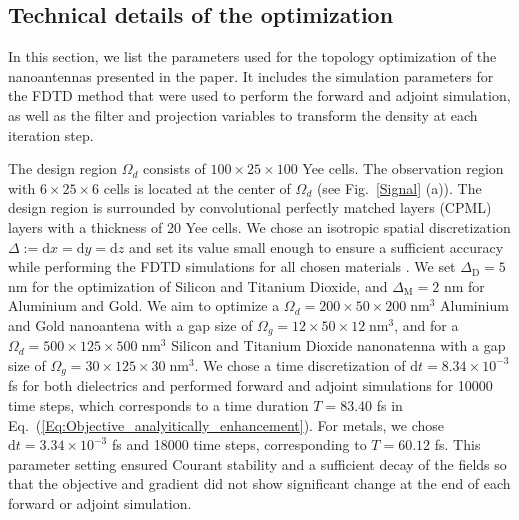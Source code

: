 \documentclass[aps,prl,twocolumn,superscriptaddress,longbibliography]{revtex4-1}
\begin{document}
\subsection{Technical details of the optimization}\label{Sec:TopOptParams}
In this section, we list the parameters used for the topology optimization of the nanoantennas presented in the paper. It includes the simulation parameters for the FDTD method that were used to perform the forward and adjoint simulation, as well as the filter and projection variables to transform the density at each iteration step.\par
The design region $\Omega_{d}$ consists of $100 \times 25 \times 100$ Yee cells. The observation region with $6 \times 25 \times 6$ cells is located at the center of $\Omega_{d}$ (see Fig.~\ref{Signal} (a)). The design region is surrounded by convolutional perfectly matched layers (CPML) layers with a thickness of 20 Yee cells. We chose an isotropic spatial discretization $\Delta:=\mathrm{d}x=\mathrm{d}y=\mathrm{d}z$ and set its value small enough to ensure a sufficient accuracy while performing the FDTD simulations for all chosen materials \cite{convergence}. We set $\Delta_{\mathrm{D}}=5$ nm for the optimization of Silicon and Titanium Dioxide, and $\Delta_{\mathrm{M}}=2$ nm for Aluminium and Gold. 
We aim to optimize a $\Omega_{d}=200\times50\times200\; \mathrm{nm}^3$ Aluminium and Gold nanoantena with a gap size of $\Omega_{g}=12\times50\times12\; \mathrm{nm}^3$, and for a $\Omega_{d}=500 \times125\times500 \; \mathrm{nm}^3$ Silicon and Titanium Dioxide nanonatenna with a gap size of $\Omega_{g}=30\times125\times30\; \mathrm{nm}^3$. 
We chose a time discretization of $\mathrm{d}t=8.34\times10^{-3}$ fs for both dielectrics and performed forward and adjoint simulations for 10000 time steps, which corresponds to a time duration $T=83.40$ fs in Eq.~(\ref{Eq:Objective_analyitically_enhancement}). For metals, we chose $\mathrm{d}t=3.34\times10^{-3}$ fs and 18000 time steps, corresponding to $T=60.12$ fs. This parameter setting ensured Courant stability and a sufficient decay of the fields so that the objective and gradient did not show significant change at the end of each forward or adjoint simulation.\par
\end{document}
